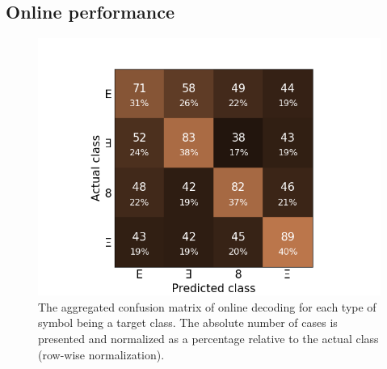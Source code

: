 \documentclass[12pt]{iopart}
\begin{document}
\subsection{Online performance}

\begin{figure}[!t]
    \includegraphics[trim={1cm 0cm 1cm 1cm},clip,width=0.7\columnwidth]{../images/OnlineConfusion_percent.png}
    \caption{The aggregated confusion matrix of online decoding for each type of symbol being
    a target class. The absolute number of cases is presented and normalized as a percentage 
    relative to the actual class (row-wise normalization).}
\label{fig:onlineconf}
\end{figure}
\end{document}
